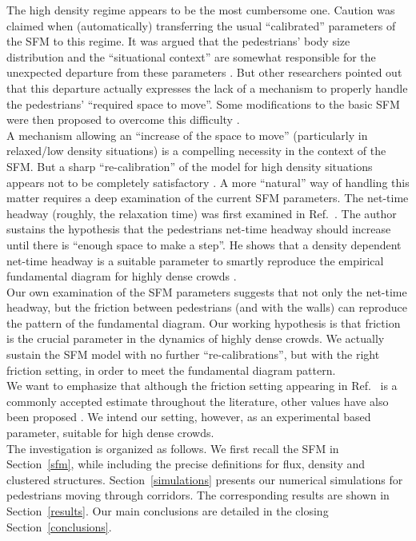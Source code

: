 \documentclass[preprint,12pt]{elsarticle}
\begin{document}
The high density regime appears to be the most cumbersome one. Caution was 
claimed when (automatically) transferring the usual ``calibrated'' parameters 
of the SFM to this regime. It was argued that the pedestrians' body size 
distribution and the ``situational context'' are somewhat responsible for the 
unexpected departure from these parameters \cite{johansson1,kwak}. But other 
researchers pointed out that this departure actually expresses the lack of a 
mechanism to properly handle the pedestrians' ``required space to move''. Some 
modifications to the basic SFM were then proposed to overcome this difficulty 
\cite{parisi2,seyfried2}. \\

A mechanism allowing an ``increase of the space to move'' (particularly in relaxed/low
 density situations) is a compelling necessity in the context of the SFM.
But a sharp ``re-calibration'' of the model for high density situations appears not 
to be completely satisfactory \cite{johansson}. A more ``natural'' way of 
handling this matter requires a deep examination of the current SFM parameters. 
The net-time headway (roughly, the relaxation time) was first examined in 
Ref.~\cite{johansson}. The author sustains the hypothesis that the 
pedestrians net-time headway should increase until there is ``enough space to 
make a step''.  He shows that a density dependent net-time headway is a 
suitable parameter to smartly reproduce the empirical fundamental diagram for 
highly dense crowds \cite{johansson}.  \\ 

Our own examination of the SFM parameters suggests that not only the net-time 
headway, but the friction between pedestrians (and with the walls) can 
reproduce the pattern of the fundamental diagram. Our working hypothesis is 
that friction is the crucial parameter in the dynamics of highly dense crowds. 
We actually sustain the SFM model with no further ``re-calibrations'', but 
with the right friction setting, in order to meet the fundamental diagram 
pattern. \\  

We want to emphasize that although the friction setting appearing in 
Ref.~\cite{Helbing1} is a commonly accepted estimate throughout the  
literature, other values have also been proposed \cite{colombi2017}. We 
intend our setting, however, as an experimental based parameter, suitable for 
high dense crowds. \\

The investigation is organized as follows. We first recall the SFM in 
Section~\ref{sfm}, while including the precise definitions for flux, density 
and clustered structures. Section~\ref{simulations} presents our numerical 
simulations for pedestrians moving through corridors. The corresponding results 
are shown in Section~\ref{results}. Our main conclusions are detailed in the 
closing Section~\ref{conclusions}.\\     
\end{document}
